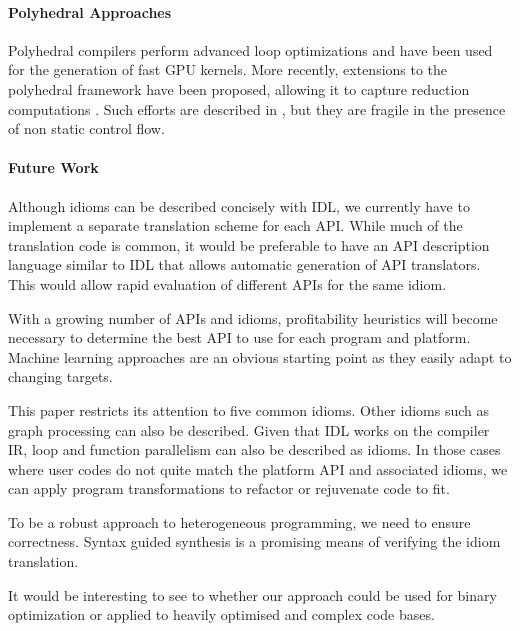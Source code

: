 \paragraph*{Polyhedral Approaches}
    Polyhedral compilers \cite{Baskaran:2010:ACC:2175462.2175482,Verdoolaege:2013:PPC:2400682.2400713} perform advanced loop optimizations and have been used for the generation of fast GPU kernels.
    More recently, extensions to the polyhedral framework have been proposed, allowing it to capture reduction computations \cite{chi1997optimizing, gupta2006simplifying, stock2014framework}.
    Such efforts are described in \cite{Doerfert2015Polly}, but they are fragile in the presence of non static control flow.

\paragraph*{Future Work}
    Although idioms can be described concisely with IDL, we currently
    have to implement a separate translation scheme for each API. While
    much of the translation code is common, it would be preferable to have
    an API description language similar to IDL that allows automatic
    generation of API translators. This would allow rapid evaluation of
    different APIs for the same idiom.

    With a growing number of APIs and idioms, profitability heuristics
    will become necessary to determine the best API to use for each
    program and platform.  Machine learning approaches are an obvious
    starting point as they easily adapt to changing targets.

    This paper restricts its attention to five common idioms. Other idioms
    such as graph processing can also be described. Given that IDL works on
    the compiler IR, loop and function parallelism can also be
    described as idioms.
    In those cases where user codes do not quite match the platform API
    and associated idioms, we can apply
    program transformations to refactor or rejuvenate code to fit.

    To be a robust approach to heterogeneous programming, we need to ensure correctness.
    Syntax guided synthesis is a promising means of verifying the idiom translation.

    It would be interesting  to see to whether our approach  could be used for binary optimization or  applied to 
    heavily optimised and  complex code bases.
